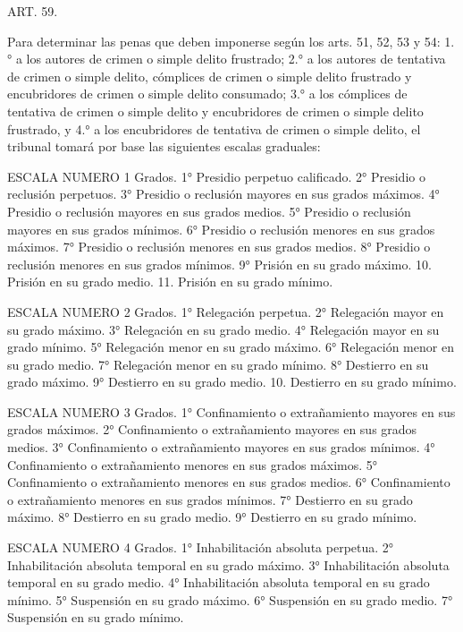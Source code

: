     ART. 59.

    Para determinar las penas que deben imponerse según los arts. 51, 52, 53 y 54: 1.° a los autores de crimen o simple delito frustrado; 2.° a los autores de tentativa de crimen o simple delito, cómplices de crimen o simple delito frustrado y encubridores de crimen o simple delito consumado; 3.° a los cómplices de tentativa de crimen o simple delito y encubridores de crimen o simple delito frustrado, y 4.° a los encubridores de tentativa de crimen o simple delito, el tribunal tomará por base las siguientes escalas graduales:

                    ESCALA NUMERO 1
    Grados.
    1° Presidio perpetuo calificado.
    2° Presidio o reclusión perpetuos.
    3° Presidio o reclusión mayores en sus grados máximos.
    4° Presidio o reclusión mayores en sus grados medios.
    5° Presidio o reclusión mayores en sus grados mínimos.
    6° Presidio o reclusión menores en sus grados máximos.
    7° Presidio o reclusión menores en sus grados medios.
    8° Presidio o reclusión menores en sus grados mínimos.
    9° Prisión en su grado máximo.
    10. Prisión en su grado medio.
    11. Prisión en su grado mínimo.

                    ESCALA NUMERO 2
    Grados.
    1° Relegación perpetua.
    2° Relegación mayor en su grado máximo.
    3° Relegación en su grado medio.
    4° Relegación mayor en su grado mínimo.
    5° Relegación menor en su grado máximo.
    6° Relegación menor en su grado medio.
    7° Relegación menor en su grado mínimo.
    8° Destierro en su grado máximo.
    9° Destierro en su grado medio.
    10. Destierro en su grado mínimo.

                  ESCALA NUMERO 3
    Grados.
    1° Confinamiento o extrañamiento mayores en sus grados máximos.
    2° Confinamiento o extrañamiento mayores en sus grados medios.
    3° Confinamiento o extrañamiento mayores en sus grados mínimos.
    4° Confinamiento o extrañamiento menores en sus grados máximos.
    5° Confinamiento o extrañamiento menores en sus grados medios.
    6° Confinamiento o extrañamiento menores en sus grados mínimos.
    7° Destierro en su grado máximo.
    8° Destierro en su grado medio.
    9° Destierro en su grado mínimo.

                  ESCALA NUMERO 4
    Grados.
    1° Inhabilitación absoluta perpetua.
    2° Inhabilitación absoluta temporal en su grado máximo.
    3° Inhabilitación absoluta temporal en su grado medio.
    4° Inhabilitación absoluta temporal en su grado mínimo.
    5° Suspensión en su grado máximo.
    6° Suspensión en su grado medio.
    7° Suspensión en su grado mínimo.

